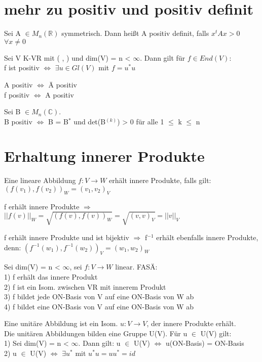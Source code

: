 \section{mehr zu positiv und positiv definit}
\begin{compactitem}
\item Sei A $\in M_n(\mathbb{R})$ symmetrisch. Dann heißt A positiv definit, falls $x^tAx > 0$ $\forall x \neq 0$
\item Sei V K-VR mit ( , ) und dim(V) = n < $\infty$. Dann gilt für $f \in End(V)$:\\
f ist positiv $\Leftrightarrow$ $\exists u \in Gl(V)$ mit $f = u^*u$
\item A positiv $\Leftrightarrow$ \={A} positiv\\
f positiv $\Leftrightarrow$ A positiv
\item Sei B $\in M_n(\mathbb{C})$.\\
B positiv $\Leftrightarrow$ B = B$^*$ und det(B$^{(k)}$) > 0 für alle 1 $\le$ k $\le$ n
\end{compactitem}

\section{Erhaltung innerer Produkte}
\begin{compactitem}
\item Eine lineare Abbildung $f: V \to W$ erhält innere Produkte, falls gilt: $(f(v_1), f(v_2))_W = (v_1, v_2)_V$
\item f erhält innere Produkte $\Rightarrow$ $||f(v)||_W = \sqrt{(f(v), f(v))_W} = \sqrt{(v,v)_V} = ||v||_V$
\item f erhält innere Produkte und ist bijektiv $\Rightarrow$ f$^{-1}$ erhält ebenfalls innere Produkte, denn: $(f^{-1}(w_1), f^{-1}(w_2))_V = (w_1, w_2)_W$
\item Sei dim(V) = n < $\infty$, sei $f: V \to W$ linear. FASÄ:\\
1) f erhält das innere Produkt\\
2) f ist ein Isom. zwischen VR mit innerem Produkt\\
3) f bildet jede ON-Basis von V auf eine ON-Basis von W ab\\
4) f bildet eine ON-Basis von V auf eine ON-Basis von W ab
\item Eine unitäre Abbildung ist ein Isom. $u: V \to V$, der innere Produkte erhält.\\
Die unitären Abbildungen bilden eine Gruppe U(V). Für u $\in$ U(V) gilt:\\
1) Sei dim(V) = n < $\infty$. Dann gilt: u $\in$ U(V) $\Leftrightarrow$ u(ON-Basis) = ON-Basis\\
2) u $\in$ U(V) $\Leftrightarrow$ $\exists u^*$ mit $u^*u=uu^*=id$
\end{compactitem}

